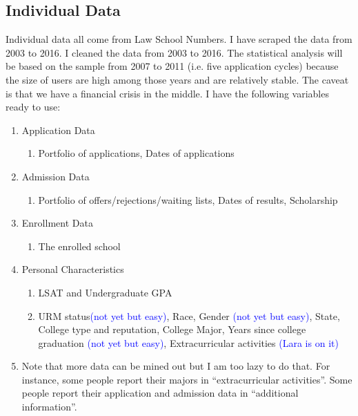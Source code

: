 \documentclass[12pt]{article}
\begin{document}
\subsection{Individual Data}
Individual data all come from Law School Numbers. I have scraped the data from 2003 to 2016. I cleaned the data from 2003 to 2016. The statistical analysis will be based on the sample from 2007 to 2011 (i.e. five application cycles) because the size of users are high among those years and are relatively stable. The caveat is that we have a financial crisis in the middle. I have the following variables ready to use:
\begin{enumerate}
\item Application Data
\begin{enumerate}
\item Portfolio of applications, Dates of applications
\end{enumerate}
\item Admission Data
\begin{enumerate}
\item Portfolio of offers/rejections/waiting lists, Dates of results, Scholarship
\end{enumerate}
\item Enrollment Data
\begin{enumerate}
\item The enrolled school
\end{enumerate}
\item Personal Characteristics
\begin{enumerate}
\item LSAT and Undergraduate GPA
\item URM status\textcolor{blue}{(not yet but easy)}, Race, Gender \textcolor{blue}{(not yet but easy)}, State, College type and reputation, College Major, Years since college graduation \textcolor{blue}{(not yet but easy)}, Extracurricular activities \textcolor{blue}{(Lara is on it)}
\end{enumerate}
\item Note that more data can be mined out but I am too lazy to do that. For instance, some people report their majors in ``extracurricular activities''. Some people report their application and admission data in ``additional information''.
\end{enumerate} 
\end{document}
